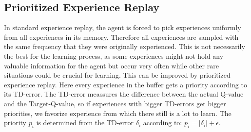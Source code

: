 \documentclass[12pt]{article}
\begin{document}
\subsection{Prioritized Experience Replay}
In standard experience replay, the agent is forced to pick experiences uniformly from all experiences in its memory. Therefore all experiences are sampled with the same frequency that they were originally experienced.
This is not necessarily the best for the learning process, as some experiences might not hold any valuable information for the agent but occur very often while other rare situations could be crucial for learning.
This can be improved by prioritized experience replay. Here every experience in the buffer gets a priority according to its TD-error.
The TD-error meassures the difference between the actual Q-value and the Target-Q-value, so if experiences with bigger TD-errors get bigger priorities, we favorize experience from which there still is a lot to learn.
The priority $p_i$ is determined from the TD-error $\delta_i$ according to:
$p_{i}=\left|\delta_{i}\right|+\epsilon $.
\end{document}
